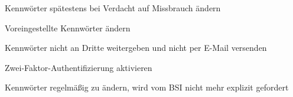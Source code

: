 \item Kennwörter spätestens bei Verdacht auf Missbrauch ändern
\item Voreingestellte Kennwörter ändern
\item Kennwörter nicht an Dritte weitergeben und nicht per E-Mail versenden
\item Zwei-Faktor-Authentifizierung aktivieren
\item Kennwörter regelmäßig zu ändern, wird vom BSI nicht mehr explizit gefordert